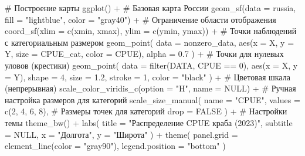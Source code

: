 \documentclass[
  letterpaper,
  DIV=11,
  numbers=noendperiod]{scrreprt}
\newenvironment{Shaded}{\begin{snugshade}}{\end{snugshade}}
\newcommand{\AttributeTok}[1]{\textcolor[rgb]{0.40,0.45,0.13}{#1}}
\newcommand{\CommentTok}[1]{\textcolor[rgb]{0.37,0.37,0.37}{#1}}
\newcommand{\ConstantTok}[1]{\textcolor[rgb]{0.56,0.35,0.01}{#1}}
\newcommand{\DecValTok}[1]{\textcolor[rgb]{0.68,0.00,0.00}{#1}}
\newcommand{\FloatTok}[1]{\textcolor[rgb]{0.68,0.00,0.00}{#1}}
\newcommand{\FunctionTok}[1]{\textcolor[rgb]{0.28,0.35,0.67}{#1}}
\newcommand{\NormalTok}[1]{\textcolor[rgb]{0.00,0.23,0.31}{#1}}
\newcommand{\SpecialCharTok}[1]{\textcolor[rgb]{0.37,0.37,0.37}{#1}}
\newcommand{\StringTok}[1]{\textcolor[rgb]{0.13,0.47,0.30}{#1}}
\begin{document}
\begin{Shaded}
\begin{Highlighting}[]
\CommentTok{\# Построение карты}
\FunctionTok{ggplot}\NormalTok{() }\SpecialCharTok{+}
  \CommentTok{\# Базовая карта России}
  \FunctionTok{geom\_sf}\NormalTok{(}\AttributeTok{data =}\NormalTok{ russia, }\AttributeTok{fill =} \StringTok{"lightblue"}\NormalTok{, }\AttributeTok{color =} \StringTok{"gray40"}\NormalTok{) }\SpecialCharTok{+} 
  \CommentTok{\# Ограничение области отображения}
  \FunctionTok{coord\_sf}\NormalTok{(}\AttributeTok{xlim =} \FunctionTok{c}\NormalTok{(xmin, xmax), }\AttributeTok{ylim =} \FunctionTok{c}\NormalTok{(ymin, ymax)) }\SpecialCharTok{+}
  \CommentTok{\# Точки наблюдений с категориальным размером}
  \FunctionTok{geom\_point}\NormalTok{(}
    \AttributeTok{data =}\NormalTok{ nonzero\_data,}
    \FunctionTok{aes}\NormalTok{(}\AttributeTok{x =}\NormalTok{ X, }\AttributeTok{y =}\NormalTok{ Y, }\AttributeTok{size =}\NormalTok{ CPUE\_cat, }\AttributeTok{color =}\NormalTok{ CPUE),}
    \AttributeTok{alpha =} \FloatTok{0.7}
\NormalTok{  ) }\SpecialCharTok{+}
  \CommentTok{\# Точки для нулевых уловов (крестики)}
  \FunctionTok{geom\_point}\NormalTok{(}
    \AttributeTok{data =} \FunctionTok{filter}\NormalTok{(DATA, CPUE }\SpecialCharTok{==} \DecValTok{0}\NormalTok{),}
    \FunctionTok{aes}\NormalTok{(}\AttributeTok{x =}\NormalTok{ X, }\AttributeTok{y =}\NormalTok{ Y),}
    \AttributeTok{shape =} \DecValTok{4}\NormalTok{, }\AttributeTok{size =} \FloatTok{1.2}\NormalTok{, }\AttributeTok{stroke =} \DecValTok{1}\NormalTok{, }\AttributeTok{color =} \StringTok{"black"}
\NormalTok{  ) }\SpecialCharTok{+}
  \CommentTok{\# Цветовая шкала (непрерывная)}
  \FunctionTok{scale\_color\_viridis\_c}\NormalTok{(}\AttributeTok{option =} \StringTok{"H"}\NormalTok{, }\AttributeTok{name =} \ConstantTok{NULL}\NormalTok{) }\SpecialCharTok{+}
  \CommentTok{\# Ручная настройка размеров для категорий}
  \FunctionTok{scale\_size\_manual}\NormalTok{(}
    \AttributeTok{name =} \StringTok{"CPUE"}\NormalTok{,}
    \AttributeTok{values =} \FunctionTok{c}\NormalTok{(}\DecValTok{2}\NormalTok{, }\DecValTok{4}\NormalTok{, }\DecValTok{6}\NormalTok{, }\DecValTok{8}\NormalTok{),  }\CommentTok{\# Размеры точек для категорий}
    \AttributeTok{drop =} \ConstantTok{FALSE}
\NormalTok{  ) }\SpecialCharTok{+}
  \CommentTok{\# Настройки темы}
  \FunctionTok{theme\_bw}\NormalTok{() }\SpecialCharTok{+}
  \FunctionTok{labs}\NormalTok{(}
    \AttributeTok{title =} \StringTok{"Распределение CPUE краба (2023)"}\NormalTok{,}
    \AttributeTok{subtitle =} \ConstantTok{NULL}\NormalTok{,}
    \AttributeTok{x =} \StringTok{"Долгота"}\NormalTok{, }
    \AttributeTok{y =} \StringTok{"Широта"}
\NormalTok{  ) }\SpecialCharTok{+}
  \FunctionTok{theme}\NormalTok{(}
    \AttributeTok{panel.grid =} \FunctionTok{element\_line}\NormalTok{(}\AttributeTok{color =} \StringTok{"gray90"}\NormalTok{),}
    \AttributeTok{legend.position =} \StringTok{"bottom"}
\NormalTok{  )}
\end{Highlighting}
\end{Shaded}
\end{document}
